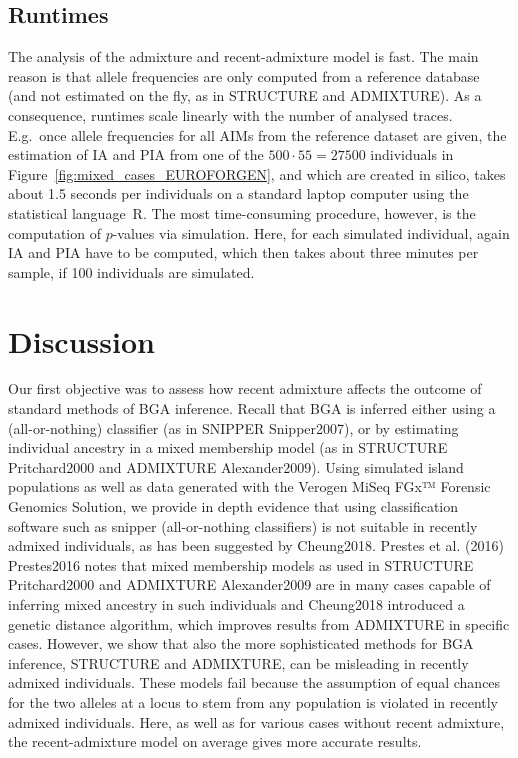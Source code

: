 \documentclass[12pt]{article}
\theoremstyle{definition}
\begin{document}
\subsection{Runtimes} 
The analysis of the admixture and recent-admixture model is fast. The main reason is that allele frequencies are only computed from a reference database (and not estimated on the fly, as in {\sc STRUCTURE} and {\sc ADMIXTURE}). As a consequence, runtimes scale linearly with the number of analysed traces. E.g.\ once allele frequencies for all AIMs from the reference dataset are given, {\color{blue} the estimation of IA and PIA} from one of the $500\cdot 55 = 27500$ individuals in Figure~\ref{fig:mixed_cases_EUROFORGEN}, and which are created in silico, takes about 1.5 seconds per individuals on a standard laptop computer using the statistical language~R. {\color{blue}The most time-consuming procedure, however, is the computation of $p$-values via simulation. Here, for each simulated individual, again IA and PIA have to be computed, which then takes about three minutes per sample, if 100 individuals are simulated.}

\section{Discussion}
Our first objective was to assess how recent admixture affects the outcome of standard methods of BGA inference. {\color{blue} Recall that BGA is inferred either using a (all-or-nothing) classifier (as in {\sc SNIPPER} \cite{article}{Snipper2007}), or by estimating individual ancestry in a mixed membership model (as in {\sc STRUCTURE} \cite{article}{Pritchard2000} and {\sc ADMIXTURE} \cite{article}{Alexander2009}).} Using simulated island populations as well as data generated with the Verogen MiSeq FGx™ Forensic Genomics Solution, we provide in depth evidence that using classification software such as {\sc snipper} (all-or-nothing classifiers) is not suitable in {\color{blue}recently admixed individuals}, as has been suggested by \cite{article}{Cheung2018}. Prestes et al. (2016) \cite{article}{Prestes2016} notes that mixed membership models as used in {\sc STRUCTURE} \cite{article}{Pritchard2000} and {\sc ADMIXTURE} \cite{article}{Alexander2009} are in many cases capable of inferring mixed ancestry in such individuals and \cite{article}{Cheung2018} introduced a genetic distance algorithm, which improves results from {\sc ADMIXTURE} in specific cases. However, we show that also the {\color{blue} more sophisticated methods} for BGA inference, {\sc STRUCTURE} and {\sc ADMIXTURE}, can be misleading in recently admixed individuals. These models fail because the assumption of equal chances for the two alleles at a locus to stem from any population is violated in recently admixed individuals. {\color{blue} Here, as well as for various cases without recent admixture, the recent-admixture model on average gives more accurate results. }
\end{document}
